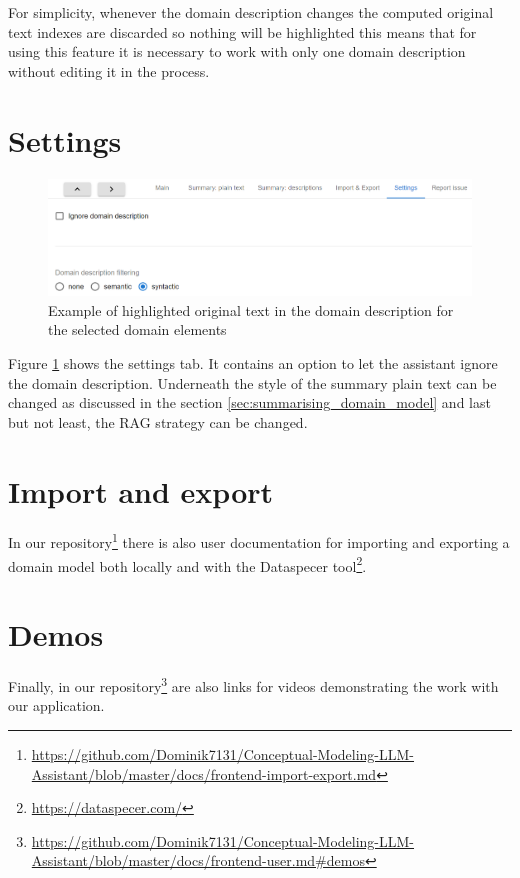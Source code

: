 For simplicity, whenever the domain description changes the computed original text indexes are discarded so nothing will be highlighted this means that for using this feature it is necessary to work with only one domain description without editing it in the process.


\section{Settings}

\begin{figure}[!h]
    \includegraphics[scale=0.46]{../docs/images/frontend/settings.png}
    \caption{\centering Example of highlighted original text in the domain description for the selected domain elements}
    \label{fig:settings_tab}
\end{figure}

Figure \ref{fig:settings_tab} shows the settings tab. It contains an option to let the assistant ignore the domain description. Underneath the style of the summary plain text can be changed as discussed in the section \ref{sec:summarising_domain_model} and last but not least, the RAG strategy can be changed.


\section{Import and export}

In our repository\footnote{\url{https://github.com/Dominik7131/Conceptual-Modeling-LLM-Assistant/blob/master/docs/frontend-import-export.md}} there is also user documentation for importing and exporting a domain model both locally and with the Dataspecer tool\footnote{\url{https://dataspecer.com/}}.


\section{Demos}

Finally, in our repository\footnote{\url{https://github.com/Dominik7131/Conceptual-Modeling-LLM-Assistant/blob/master/docs/frontend-user.md\#demos}} are also links for videos demonstrating the work with our application.